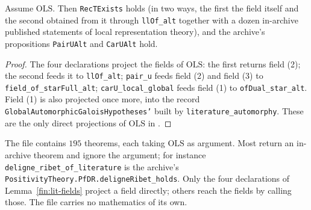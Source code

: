 \begin{lemma}\label{fin:lit-fields}
Assume $\mathrm{OLS}$. Then \texttt{RecTExists} holds (in two ways, the first the
field itself and the second obtained from it through \texttt{llOf\_alt} together
with a dozen in-archive published statements of local representation theory),
and the archive's propositions \texttt{PairUAlt} and \texttt{CarUAlt} hold.
\end{lemma}
\begin{proof}
The four declarations project the fields of $\mathrm{OLS}$: the first returns
field (2); the second feeds it to \texttt{llOf\_alt}; \texttt{pair\_u} feeds
field (2) and field (3) to \texttt{field\_of\_starFull\_alt}; \texttt{carU\_local\_global}
feeds field (1) to \texttt{ofDual\_star\_alt}. Field (1) is also projected once
more, into the record \texttt{GlobalAutomorphicGaloisHypotheses'} built by
\texttt{literature\_automorphy}. These are the only direct projections of
$\mathrm{OLS}$ in .
\end{proof}

\begin{remark}\label{fin:rem-plumbing}
The file 
contains $195$ theorems, each taking $\mathrm{OLS}$ as argument. Most return an
in-archive theorem and ignore the argument; for instance
\texttt{deligne\_ribet\_of\_literature} is the archive's
\texttt{PositivityTheory.PfDR.deligneRibet\_holds}. Only the four declarations
of Lemma~\ref{fin:lit-fields} project a field directly; others reach the fields
by calling those. The file carries no mathematics of its own.
\end{remark}

